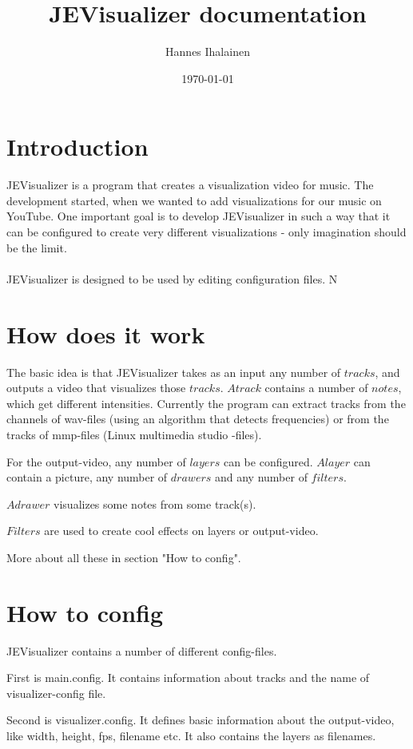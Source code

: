 \documentclass{article}
\title{JEVisualizer documentation}
\author{Hannes Ihalainen}
\date{\today}
\begin{document}
  \maketitle
  \newpage
  \tableofcontents
  \newpage
    
  \section{Introduction}
    JEVisualizer is a program that creates a visualization video for music. The development started, when we wanted to add visualizations for our music on YouTube. One important goal is to develop JEVisualizer in such a way that it can be configured to create very different visualizations - only imagination should be the limit. \\ \\
    JEVisualizer is designed to be used by editing configuration files. N
  \newpage
  \section{How does it work}
    The basic idea is that JEVisualizer takes as an input any number of $tracks$, and outputs a video that visualizes those $tracks$. $A track$
    contains a number of $notes$, which get different intensities. Currently the program can extract tracks from the channels of wav-files
    (using an algorithm that detects frequencies) or from the tracks of mmp-files (Linux multimedia studio -files).
    
    For the output-video, any number of $layers$ can be configured. $A layer$ can contain a picture, any number of $drawers$ and any number 
    of $filters$.
    
    $A drawer$ visualizes some notes from some track(s).
    
    $Filters$ are used to create cool effects on layers or output-video.
    
    More about all these in section "How to config".
  \newpage
  \section{How to config}
    JEVisualizer contains a number of different config-files.
    
    First is main.config. It contains information about tracks and the name of visualizer-config file.
    
    Second is visualizer.config. It defines basic information about the output-video, like width, height, fps, filename etc. It also contains the layers as filenames.
    
\end{document}

